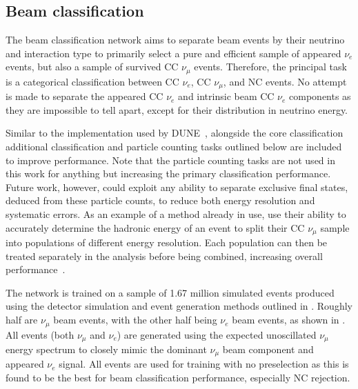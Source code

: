\subsection{Beam classification}%
\label{sec:cnn_specific_beam} %

The beam classification network aims to separate beam events by their neutrino and interaction
type to primarily select a pure and efficient sample of appeared $\nu_{e}$ events, but also a
sample of survived CC $\nu_{\mu}$ events. Therefore, the principal task is a categorical
classification between CC $\nu_{e}$, CC $\nu_{\mu}$, and NC events. No attempt is made to separate
the appeared CC $\nu_{e}$ and intrinsic beam CC $\nu_{e}$ components as they are impossible to
tell apart, except for their distribution in neutrino energy.

Similar to the implementation used by DUNE~\cite{collaboration2020}, alongside the core
classification additional classification and particle counting tasks outlined below are included
to improve performance. Note that the particle counting tasks are not used in this work for
anything but increasing the primary classification performance. Future work, however, could
exploit any ability to separate exclusive final states, deduced from these particle counts, to
reduce both energy resolution and systematic errors. As an example of a method already in use,
\nova use their ability to accurately determine the hadronic energy of an event to split their CC
$\nu_{\mu}$ sample into populations of different energy resolution. Each population can then be
treated separately in the analysis before being combined, increasing overall
performance~\cite{acero2018}.

The network is trained on a sample of 1.67 million simulated events produced using the detector
simulation and event generation methods outlined in . Roughly
half are $\nu_{\mu}$ beam events, with the other half being $\nu_{e}$ beam events, as shown in
. All events (both $\nu_{\mu}$ and $\nu_{e}$) are generated
using the expected unoscillated \chipsfive $\nu_{\mu}$ energy spectrum to closely mimic the
dominant $\nu_{\mu}$ beam component and appeared $\nu_{e}$ signal. All events are used for
training with no preselection as this is found to be the best for beam classification performance,
especially NC rejection.

